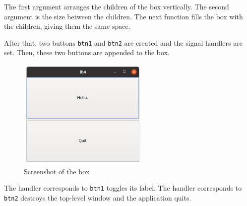 The first argument arranges the children of the box vertically. The
second argument is the size between the children. The next function
fills the box with the children, giving them the same space.

After that, two buttons \passthrough{\lstinline!btn1!} and
\passthrough{\lstinline!btn2!} are created and the signal handlers are
set. Then, these two buttons are appended to the box.

\begin{figure}
\centering
\includegraphics[width=6.3cm,height=5.325cm]{../image/screenshot_lb4.png}
\caption{Screenshot of the box}
\end{figure}

The handler corresponds to \passthrough{\lstinline!btn1!} toggles its
label. The handler corresponds to \passthrough{\lstinline!btn2!}
destroys the top-level window and the application quits.
